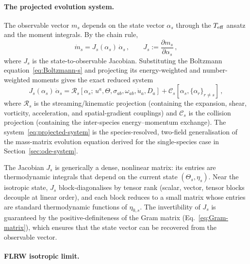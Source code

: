 \paragraph{The projected evolution system.}

The observable vector $m_s$ depends on the state vector
$\alpha_s$ through the $T_{\mathrm{eff}}$ ansatz and the moment
integrals.  By the chain rule,
\begin{equation}\label{eq:chain-rule}
\dot{m}_s
= J_s(\alpha_s)\, \dot{\alpha}_s\,,
\qquad
J_s := \frac{\partial m_s}{\partial \alpha_s}\,,
\end{equation}
where $J_s$ is the state-to-observable Jacobian.
Substituting the Boltzmann
equation~\eqref{eq:Boltzmann-s} and projecting its
energy-weighted and number-weighted moments gives the
exact reduced system
\begin{equation}\label{eq:projected-system}
\boxed{
J_s(\alpha_s)\, \dot{\alpha}_s
= \mathcal{R}_s[\alpha_s;\, u^a, \Theta,
  \sigma_{ab}, \omega_{ab}, \dot{u}_a, D_a]
+ \mathcal{C}_s[\alpha_s, \{\alpha_r\}_{r \neq s}]\,,
}
\end{equation}
where $\mathcal{R}_s$ is the streaming/kinematic
projection (containing the expansion, shear, vorticity,
acceleration, and spatial-gradient couplings) and
$\mathcal{C}_s$ is the collision projection
(containing the inter-species energy--momentum
exchange).  The system~\eqref{eq:projected-system} is
the species-resolved, two-field generalisation of the
mass-matrix evolution equation derived for the
single-species case in Section~\ref{sec:ode-system}.

The Jacobian $J_s$ is generically a dense, nonlinear
matrix: its entries are thermodynamic integrals that
depend on the current state $(\Theta_s, \eta_s)$.
Near the isotropic state, $J_s$ block-diagonalises by
tensor rank (scalar, vector, tensor blocks decouple at
linear order), and each block reduces to a small
matrix whose entries are standard thermodynamic
functions of $\eta_{0,s}$.  The invertibility of $J_s$
is guaranteed by the positive-definiteness of the
Gram matrix (Eq.~\ref{eq:Gram-matrix}), which ensures
that the state vector can be recovered from the
observable vector.


\paragraph{FLRW isotropic limit.}


